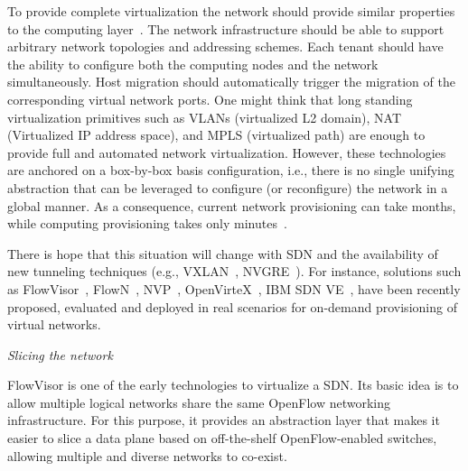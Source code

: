 To provide complete virtualization the network should provide similar properties to the computing layer~\cite{chowdhury2010}.
The network infrastructure should be able to support arbitrary network topologies and addressing schemes.
Each tenant should have the ability to configure both the computing nodes and the network simultaneously.
Host migration should automatically trigger the migration of the corresponding virtual network ports.
One might think that long standing virtualization primitives such as VLANs (virtualized L2 domain), NAT (Virtualized IP address space), and 
MPLS (virtualized path) are enough to provide full and automated network virtualization.
However, these  technologies are anchored on a box-by-box basis configuration, i.e., there is no single unifying 
abstraction that can be leveraged to configure (or reconfigure) the network in a global manner.
As a consequence, current network provisioning can take months, while computing provisioning takes only 
minutes~\cite{koponen,cearley2013,peng2012,zhang2014}.

There is hope that this situation will change with SDN and the availability of new tunneling techniques (e.g., VXLAN~\cite{mahalingam2013}, NVGRE~\cite{sridharan2013}).
For instance, solutions such as FlowVisor~\cite{sherwood2009,sherwood2010,azodolmolky2012},  FlowN~\cite{drutskoy2012}, NVP~\cite{koponen}, OpenVirteX~\cite{al-shabibi2014,Al_Shabibi2014_4}, IBM SDN VE~\cite{racherla2014,li2014},  have been recently proposed, evaluated and deployed in real scenarios for on-demand provisioning of virtual networks.

\vspace{2mm}
\noindent \textit{Slicing the network}

FlowVisor is one of the early technologies to virtualize a SDN.
Its basic idea is to allow multiple logical networks share the same OpenFlow networking infrastructure.
For this purpose, it provides an abstraction layer that makes it easier to slice a data plane based on off-the-shelf OpenFlow-enabled switches, allowing multiple and diverse networks to co-exist. 

